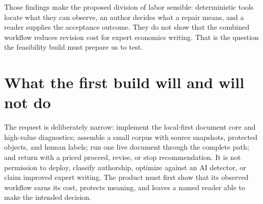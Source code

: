 Those findings make the proposed division of labor sensible: deterministic
tools locate what they can observe, an author decides what a repair means, and
a reader supplies the acceptance outcome. They do not show that the combined
workflow reduces revision cost for expert economics writing. That is the
question the feasibility build must prepare us to test.

\section{What the first build will and will not do}

The request is deliberately narrow: implement the local-first
document core and high-value diagnostics; assemble a small corpus with source
snapshots, protected objects, and human labels; run one live document through
the complete path; and return with a priced proceed, revise, or stop
recommendation. It is not permission to deploy, classify authorship,
optimize against an AI detector, or claim improved expert writing. The product
must first show that its observed workflow earns its cost, protects meaning,
and leaves a named reader able to make the intended decision.
